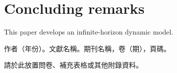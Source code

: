 \documentclass[12pt,a4paper,oneside]{report}
\begin{document}
\chapter{Concluding remarks}

This paper develops an infinite-horizon dynamic model.

\NTOUReferences
作者（年份）。文獻名稱。期刊名稱，卷（期），頁碼。

\NTOUAppendix
請於此放置問卷、補充表格或其他附錄資料。
 
\end{document}
